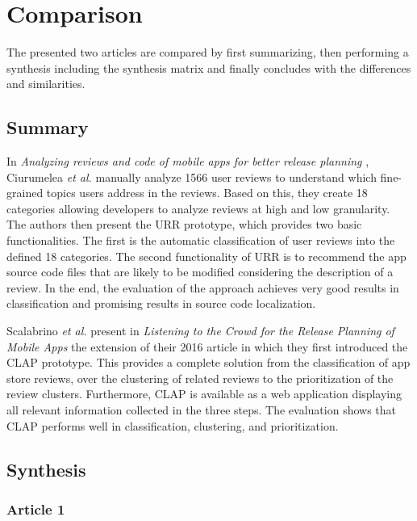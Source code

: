 \section{Comparison}\label{sec:02_comparison}

The presented two articles are compared by first summarizing, then performing a synthesis including the synthesis matrix and finally concludes with the differences and similarities.

\subsection{Summary}

In \textit{Analyzing reviews and code of mobile apps for better release planning} \cite{Ciurumelea.2017}, Ciurumelea \textit{et al.} manually analyze 1566 user reviews to understand which fine-grained topics users address in the reviews. Based on this, they create 18 categories allowing developers to analyze reviews at high and low granularity.  The authors then present the URR prototype, which provides two basic functionalities. The first is the automatic classification of user reviews into the defined 18 categories. The second functionality of URR is to recommend the app source code files that are likely to be modified considering the description of a review. In the end, the evaluation of the approach achieves very good results in classification and promising results in source code localization.

Scalabrino \textit{et al.} present in \textit{Listening to the Crowd for the Release Planning of Mobile Apps} \cite{Scalabrino.2019} the extension of their 2016 article \cite{Villarroel.2016} in which they first introduced the CLAP prototype. This provides a complete solution from the classification of app store reviews, over the clustering of related reviews to the prioritization of the review clusters. Furthermore, CLAP is available as a web application displaying all relevant information collected in the three steps. 
The evaluation shows that CLAP performs well in classification, clustering, and prioritization.

\subsection{Synthesis}

\subsubsection{Article 1}

